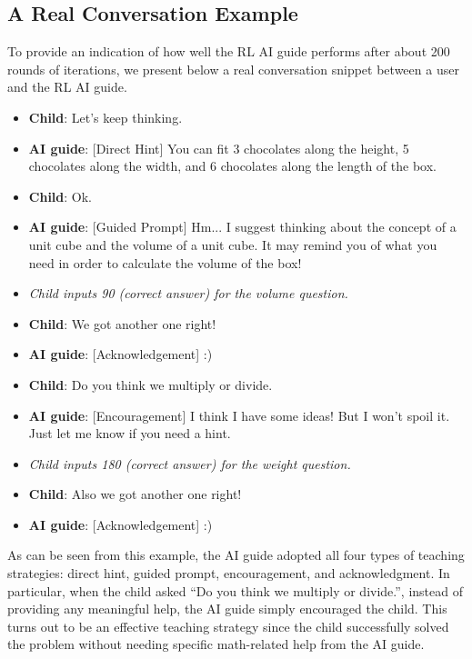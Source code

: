 \documentclass[sn-mathphys,Numbered]{sn-jnl}%
\theoremstyle{thmstyleone}%
\theoremstyle{thmstyletwo}%
\theoremstyle{thmstylethree}%
\begin{document}
\begin{appendices}



\section{}

\subsection*{A Real Conversation Example}
To provide an indication of how well the RL AI guide performs after about 200 rounds of iterations, we present below a real conversation snippet between a user and the RL AI guide.

\begin{itemize}
    \item[] \textbf{Child}: Let's keep thinking.
    \item[] \textbf{AI guide}: [Direct Hint] You can fit 3 chocolates along the height, 5 chocolates along the width, and 6 chocolates along the length of the box.
    \item[] \textbf{Child}: Ok.
    \item[] \textbf{AI guide}: [Guided Prompt] Hm... I suggest thinking about the concept of a unit cube and the volume of a unit cube. It may remind you of what you need in order to calculate the volume of the box!
    \item[] \textit{Child inputs 90 (correct answer) for the volume question.}
    \item[] \textbf{Child}: We got another one right!
    \item[] \textbf{AI guide}: [Acknowledgement] :)
    \item[] \textbf{Child}: Do you think we multiply or divide.
    \item[] \textbf{AI guide}: [Encouragement] I think I have some ideas! But I won't spoil it. Just let me know if you need a hint.
    \item[] \textit{Child inputs 180 (correct answer) for the weight question.}
    \item[] \textbf{Child}: Also we got another one right!
    \item[] \textbf{AI guide}: [Acknowledgement] :)
\end{itemize}

As can be seen from this example, the AI guide adopted all four types of teaching strategies: direct hint, guided prompt, encouragement, and acknowledgment. In particular, when the child asked ``Do you think we multiply or divide.'', instead of providing any meaningful help, the AI guide simply encouraged the child. This turns out to be an effective teaching strategy since the child successfully solved the problem without needing specific math-related help from the AI guide.


\end{appendices}
\end{document}
